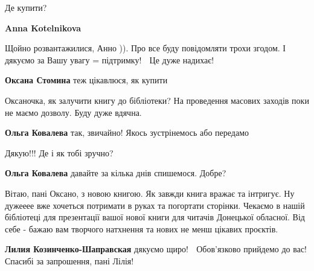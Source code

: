  
 
 
 
 

\qqSecCmt


Де купити?

\begin{itemize} %
\textbf{Anna Kotelnikova} 

Щойно розвантажилися, Анно )). Про все буду повідомляти трохи згодом. І дякуємо
за Вашу увагу = підтримку! 🙂 Це дуже надихає! 🙂

\textbf{Оксана Стомина} теж цікавлюся, як купити
\end{itemize} %


Оксаночка, як залучити книгу до бібліотеки? На проведення масових заходів поки
не маємо дозволу. Буду дуже вдячна.

\begin{itemize} %
\textbf{Ольга Ковалева} так, звичайно! Якось зустрінемось або передамо 🙂


Дякую!!! Де і як тобі зручно?

\textbf{Ольга Ковалева} давайте за кілька днів спишемося. Добре?
\end{itemize} %


Вітаю, пані Оксано, з новою книгою. Як завжди книга вражає та інтригує. Ну
дужееее вже хочеться потримати в руках та погортати сторінки. Чекаємо в нашій
бібліотеці для презентації вашої нової книги для читачів Донецької обласної.
Від себе - бажаю вам творчого натхнення та нових не менш цікавих проєктів. 

\begin{itemize} %
\textbf{Лилия Козинченко-Шаправская} дякуємо щиро! 🙂 Обов'язково прийдемо до вас! Спасибі за запрошення, пані Лілія! 🙂 
\end{itemize} %

